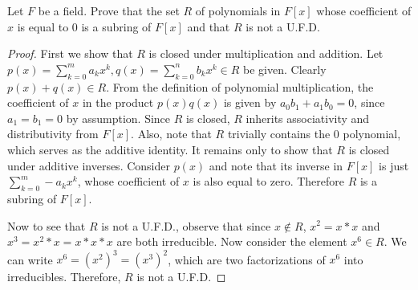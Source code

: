 \documentclass[10pt]{amsart}
\begin{document}
\begin{thm}
  \label{Ex6}
  Let $F$ be a field. 
  Prove that the set $R$ of polynomials in $F[x]$ whose coefficient of $x$ is equal to 0 is a subring of $F[x]$ and that $R$ is not a U.F.D.
  \begin{proof}
    First we show that $R$ is closed under multiplication and addition.
    Let $p(x) = \sum_{k=0}^m a_kx^k, q(x) = \sum_{k=0}^n b_kx^k \in R$  be given.
    Clearly $p(x) + q(x) \in R$.
    From the definition of polynomial multiplication, the coefficient of $x$ in the product $p(x)q(x)$ is given by $a_0b_1 + a_1b_0 = 0$, since $a_1 = b_1 = 0$ by assumption.
    Since $R$ is closed, $R$ inherits associativity and distributivity from $F[x]$.
    Also, note that $R$ trivially contains the $0$ polynomial, which serves as the additive identity.
    It remains only to show that $R$ is closed under additive inverses.
    Consider $p(x)$ and note that its inverse in $F[x]$ is just $\sum_{k=0}^m -a_kx^k$, whose coefficient of $x$ is also equal to zero.
    Therefore $R$ is a subring of $F[x]$.
    
    Now to see that $R$ is not a U.F.D., observe that since $x \not \in R$, $x^2 = x*x$ and $x^3 = x^2*x = x*x*x$ are both irreducible.  
    Now consider the element $x^6 \in R$.
    We can write $x^6 = (x^2)^3 = (x^3)^2$, which are two factorizations of $x^6$ into irreducibles.
    Therefore, $R$ is not a U.F.D.
  \end{proof}
\end{thm}
\end{document}
